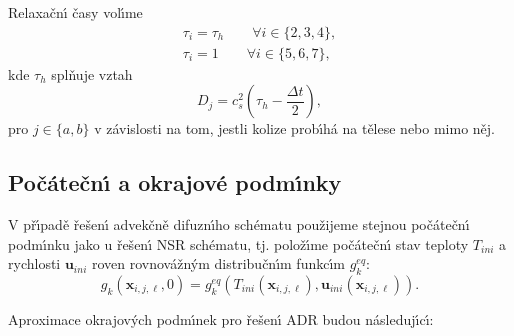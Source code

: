         Relaxa\v{c}n\'{\i} \v{c}asy vol\'{\i}me 
        \begin{subequations}
            \begin{align}
                \tau_i = \tau_h  \qquad \forall i \in \{2,3,4\}, \\
                \tau_i = 1 \qquad \forall i \in \{5,6,7 \},
            \end{align}
        \end{subequations}
        kde $\tau_h$ spl\v{n}uje vztah 
        \begin{equation}
            D_j = c_s^2 \left( \tau_h - \frac{\Delta t}{2} \right),
        \end{equation}
        pro $j \in \{a, b\}$ v z\'{a}vislosti na tom, jestli kolize prob\'{\i}h\'{a} na t\v{e}lese nebo mimo n\v{e}j.


        \subsection{Po\v{c}\'{a}te\v{c}n\'{\i} a okrajov\'{e} podm\'{\i}nky}
        \label{sec:ADEIniCon}

        V p\v{r}\'{\i}pad\v{e} \v{r}e\v{s}en\'{\i} advek\v{c}n\v{e} difuzn\'{\i}ho sch\'{e}matu pou\v{z}ijeme stejnou po\v{c}\'{a}te\v{c}n\'{\i} podm\'{\i}nku jako u \v{r}e\v{s}en\'{\i} NSR sch\'{e}matu, tj. polo\v{z}\'{\i}me po\v{c}\'{a}te\v{c}n\'{\i} stav teploty $T_{ini}$ a rychlosti $\boldsymbol{u}_{ini}$ roven rovnov\'{a}\v{z}n\'{y}m distribu\v{c}n\'{\i}m funkc\'{\i}m $g_k^{eq}$:
        \begin{equation}
            \label{eq:FirIniConADE}
                g_k(\boldsymbol{x}_{i,j,\ell}, 0) = g_{k}^{eq}(T_{ini}(\boldsymbol{x}_{i,j,\ell}), \boldsymbol{u}_{ini}(\boldsymbol{x}_{i,j,\ell})).
        \end{equation}
        
        Aproximace okrajov\'{y}ch podm\'{\i}nek pro \v{r}e\v{s}en\'{\i} ADR budou n\'{a}sleduj\'{\i}c\'{\i}:

